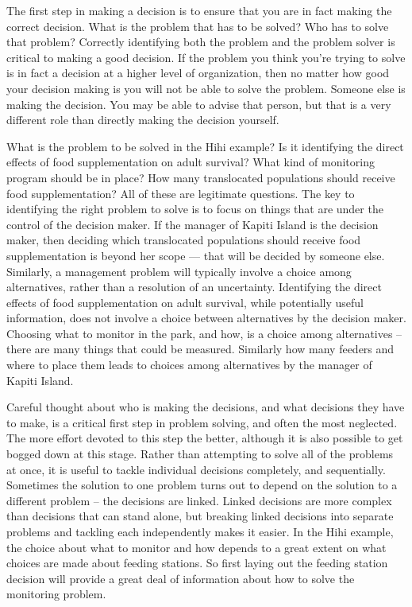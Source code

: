 \documentclass[]{book}
\begin{document}
The first step in making a decision is to ensure that you are in fact
making the correct decision. What is the problem that has to be solved?
Who has to solve that problem? Correctly identifying both the problem
and the problem solver is critical to making a good decision. If the
problem you think you're trying to solve is in fact a decision at a
higher level of organization, then no matter how good your decision
making is you will not be able to solve the problem. Someone else is
making the decision. You may be able to advise that person, but that is
a very different role than directly making the decision yourself.

What is the problem to be solved in the Hihi example? Is it identifying
the direct effects of food supplementation on adult survival? What kind
of monitoring program should be in place? How many translocated
populations should receive food supplementation? All of these are
legitimate questions. The key to identifying the right problem to solve
is to focus on things that are under the control of the decision maker.
If the manager of Kapiti Island is the decision maker, then deciding
which translocated populations should receive food supplementation is
beyond her scope --- that will be decided by someone else. Similarly, a
management problem will typically involve a choice among alternatives,
rather than a resolution of an uncertainty. Identifying the direct
effects of food supplementation on adult survival, while potentially
useful information, does not involve a choice between alternatives by
the decision maker. Choosing what to monitor in the park, and how, is a
choice among alternatives -- there are many things that could be
measured. Similarly how many feeders and where to place them leads to
choices among alternatives by the manager of Kapiti Island.

Careful thought about who is making the decisions, and what decisions
they have to make, is a critical first step in problem solving, and
often the most neglected. The more effort devoted to this step the
better, although it is also possible to get bogged down at this stage.
Rather than attempting to solve all of the problems at once, it is
useful to tackle individual decisions completely, and sequentially.
Sometimes the solution to one problem turns out to depend on the
solution to a different problem -- the decisions are linked. Linked
decisions are more complex than decisions that can stand alone, but
breaking linked decisions into separate problems and tackling each
independently makes it easier. In the Hihi example, the choice about
what to monitor and how depends to a great extent on what choices are
made about feeding stations. So first laying out the feeding station
decision will provide a great deal of information about how to solve the
monitoring problem.
\end{document}
